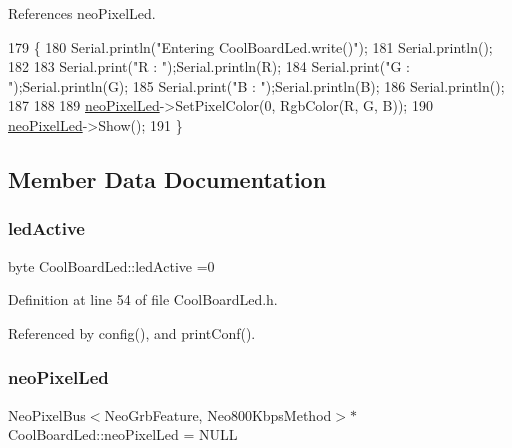 References neo\+Pixel\+Led.


\begin{DoxyCode}
179 \{
180     Serial.println(\textcolor{stringliteral}{"Entering CoolBoardLed.write()"});
181     Serial.println();
182 
183     Serial.print(\textcolor{stringliteral}{"R : "});Serial.println(R);
184     Serial.print(\textcolor{stringliteral}{"G : "});Serial.println(G);
185     Serial.print(\textcolor{stringliteral}{"B : "});Serial.println(B);
186     Serial.println();   
187 
188 
189     \hyperlink{classCoolBoardLed_ac2c13fa462a010cd9242bf297c013923}{neoPixelLed}->SetPixelColor(0, RgbColor(R, G, B));
190     \hyperlink{classCoolBoardLed_ac2c13fa462a010cd9242bf297c013923}{neoPixelLed}->Show();
191 \}
\end{DoxyCode}


\subsection{Member Data Documentation}
\mbox{\label{classCoolBoardLed_a5f17c135516fcf4b44ea8a096ba0177a}} 
\subsubsection{\texorpdfstring{led\+Active}{ledActive}}
{\footnotesize\ttfamily byte Cool\+Board\+Led\+::led\+Active =0\hspace{0.3cm}{\ttfamily [private]}}



Definition at line 54 of file Cool\+Board\+Led.\+h.



Referenced by config(), and print\+Conf().

\mbox{\label{classCoolBoardLed_ac2c13fa462a010cd9242bf297c013923}} 
\subsubsection{\texorpdfstring{neo\+Pixel\+Led}{neoPixelLed}}
{\footnotesize\ttfamily Neo\+Pixel\+Bus$<$Neo\+Grb\+Feature, Neo800\+Kbps\+Method$>$$\ast$ Cool\+Board\+Led\+::neo\+Pixel\+Led = N\+U\+LL\hspace{0.3cm}{\ttfamily [private]}}



